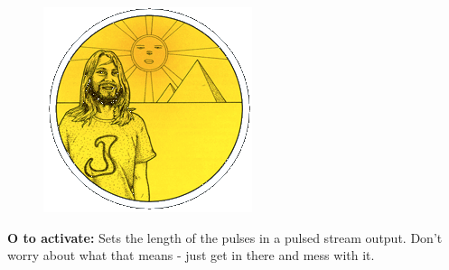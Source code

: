 \begin{definition}
\setlength{\intextsep}{0pt}%
\setlength{\columnsep}{3pt}%
\begin{figure}
\includegraphics[width=\linewidth]{src/callout/psych.png} 
\end{figure}
\small
\textbf{O to activate:} Sets the length of the pulses in a
pulsed stream output. Don’t worry about what that means - just get
in there and mess with it.
\\
\\
\end{definition}


